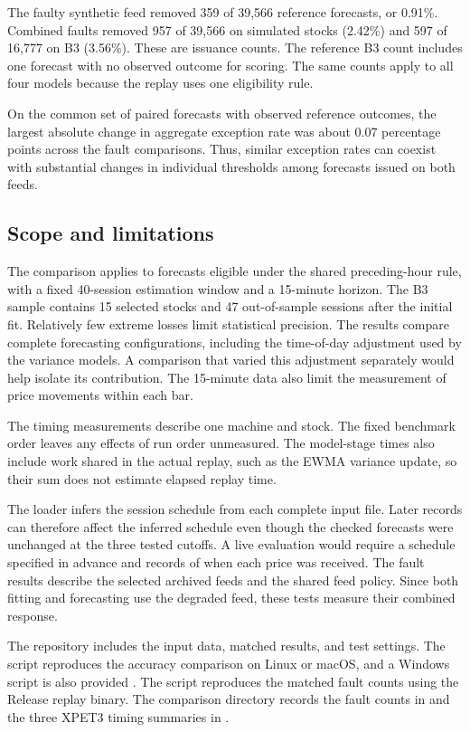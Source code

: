 \documentclass[
	12pt,				%
	openright,			%
	twoside,			%
	a4paper,
	chapter=TITLE,
	english				%
	]{abntex2}
\begin{document}
The faulty synthetic feed removed 359 of 39,566 reference forecasts, or 0.91\%. Combined faults removed 957 of 39,566 on simulated stocks (2.42\%) and 597 of 16,777 on B3 (3.56\%). These are issuance counts. The reference B3 count includes one forecast with no observed outcome for scoring. The same counts apply to all four models because the replay uses one eligibility rule.

On the common set of paired forecasts with observed reference outcomes, the largest absolute change in aggregate exception rate was about 0.07 percentage points across the fault comparisons. Thus, similar exception rates can coexist with substantial changes in individual thresholds among forecasts issued on both feeds.

\subsection{Scope and limitations}

The comparison applies to forecasts eligible under the shared preceding-hour rule, with a fixed 40-session estimation window and a 15-minute horizon. The B3 sample contains 15 selected stocks and 47 out-of-sample sessions after the initial fit. Relatively few extreme losses limit statistical precision. The results compare complete forecasting configurations, including the time-of-day adjustment used by the variance models. A comparison that varied this adjustment separately would help isolate its contribution. The 15-minute data also limit the measurement of price movements within each bar.

The timing measurements describe one machine and stock. The fixed benchmark order leaves any effects of run order unmeasured. The model-stage times also include work shared in the actual replay, such as the EWMA variance update, so their sum does not estimate elapsed replay time.

The loader infers the session schedule from each complete input file. Later records can therefore affect the inferred schedule even though the checked forecasts were unchanged at the three tested cutoffs. A live evaluation would require a schedule specified in advance and records of when each price was received. The fault results describe the selected archived feeds and the shared feed policy. Since both fitting and forecasting use the degraded feed, these tests measure their combined response.

The repository includes the input data, matched results, and test settings. The script  reproduces the accuracy comparison on Linux or macOS, and a Windows script is also provided \cite{project-comparison}. The script  reproduces the matched fault counts using the Release replay binary. The comparison directory records the fault counts in  and the three XPET3 timing summaries in .
\end{document}
